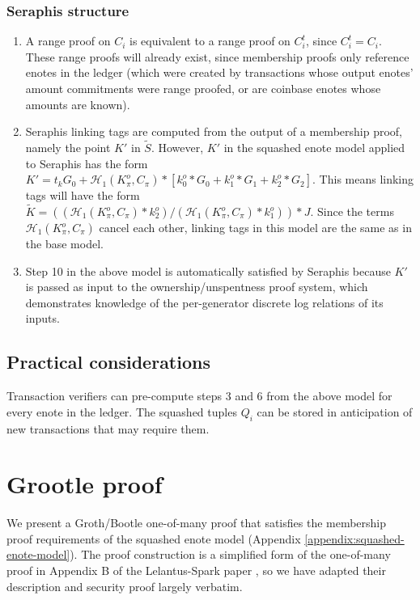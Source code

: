 \begin{appendices}
\subsubsection{Seraphis structure}

\begin{enumerate}
    \item A range proof on $C_i$ is equivalent to a range proof on $C^t_i$, since $C^t_i = C_i$. These range proofs will already exist, since membership proofs only reference enotes in the ledger (which were created by transactions whose output enotes' amount commitments were range proofed, or are coinbase enotes whose amounts are known).

    \item Seraphis linking tags are computed from the output of a membership proof, namely the point $K'$ in $\tilde{S}$. However, $K'$ in the squashed enote model applied to Seraphis has the form $K' = t_k G_0 + \mathcal{H}_1(K^o_{\pi}, C_{\pi})*[k^o_0*G_0 + k^o_1*G_1 + k^o_2*G_2]$. This means linking tags will have the form $\tilde{K} = ((\mathcal{H}_1(K^o_{\pi}, C_{\pi})*k^o_2)/(\mathcal{H}_1(K^o_{\pi}, C_{\pi})*k^o_1))*J$. Since the terms $\mathcal{H}_1(K^o_{\pi}, C_{\pi})$ cancel each other, linking tags in this model are the same as in the base model.

    \item Step 10 in the above model is automatically satisfied by Seraphis because $K'$ is passed as input to the ownership/unspentness proof system, which demonstrates knowledge of the per-generator discrete log relations of its inputs.
\end{enumerate}


\subsection{Practical considerations}
\label{appendix:squashed-enote-model-practical-considerations}

Transaction verifiers can pre-compute steps 3 and 6 from the above model for every enote in the ledger. The squashed tuples $Q_i$ can be stored in anticipation of new transactions that may require them.



\section{Grootle proof}
\label{appendix:grootle-proof}

We present a Groth/Bootle one-of-many proof \cite{groth-one-out-of-many, bootle-one-of-many, matrict} that satisfies the membership proof requirements of the squashed enote model (Appendix \ref{appendix:squashed-enote-model}). The proof construction is a simplified form of the one-of-many proof in Appendix B of the Lelantus-Spark paper \cite{lelantus-spark}, so we have adapted their description and security proof largely verbatim.



\end{appendices}
